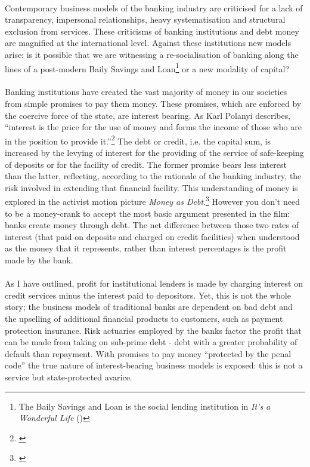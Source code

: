 \documentclass[12pt,a4paper,titlepage]{article}
\begin{document}
\doublespacing
\paragraph{}Contemporary business models of the banking industry are criticised for a lack of transparency, impersonal relationships, heavy systematisation and structural exclusion from services. These criticisms of banking institutions and debt money are magnified at the international level. Against these institutions new models arise: is it possible that we are witnessing a re-socialisation of banking along the lines of a post-modern Baily Savings and Loan\footnote{The Baily Savings and Loan is the social lending institution in \textit{It's a Wonderful Life} (\cite{capra:1947wl})} or a new modality of capital?

\paragraph{}Banking institutions have created the vast majority of money in our societies from simple promises to pay them money. These promises, which are enforced by the coercive force of the state, are interest bearing. As Karl Polanyi describes, ``interest is the price for the use of money and forms the income of those who are in the position to provide it.''\footnote{\cite[p. 69]{Polanyi:1957mi}} The debt or credit, i.e. the capital sum, is increased by the levying of interest for the providing of the service of safe-keeping of deposits or for the facility of credit. The former promise bears less interest than the latter, reflecting, according to the rationale of the banking industry, the risk involved in extending that financial facility. This understanding of money is explored in the activist motion picture \textit{Money as Debt}.\footnote{\cite{grignon:2006}} However you don't need to be a money-crank to accept the most basic argument presented in the film: banks create money through debt. The net difference between those two rates of interest (that paid on deposits and charged on credit facilities) when understood as the money that it represents, rather than interest percentages is the profit made by the bank.

\paragraph{}As I have outlined, profit for institutional lenders is made by charging interest on credit services minus the interest paid to depositors. Yet, this is not the whole story; the business models of traditional banks are dependent on bad debt and the upselling of additional financial products to customers, such as payment protection insurance. Risk actuaries employed by the banks factor the profit that can be made from taking on sub-prime debt - debt with a greater probability of default than repayment. With promises to pay money ``protected by the penal code'' the true nature of interest-bearing business models is exposed: this is not a service but state-protected avarice.
\end{document}
